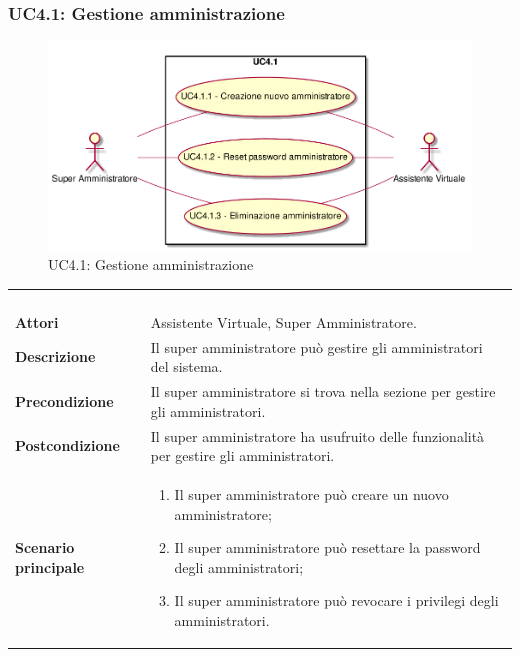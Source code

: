 \newpage\subsubsection{UC4.1: Gestione amministrazione}
\label{UC4.1}
\begin{figure}[h]
\centering
\includegraphics[width=\textwidth,height=\textheight,keepaspectratio]{images/UseCaseUC41.png}
\caption{UC4.1: Gestione amministrazione}
\end{figure}
\begin{longtable}{l|p{10cm}}
\rowcolor[gray]{0.8} \multicolumn{2}{c}{} \\
\rowcolor[gray]{0.8} \multicolumn{2}{c}{\textbf{UC4.1 - Gestione amministrazione}} \\
\rowcolor[gray]{0.8} \multicolumn{2}{c}{} \\
\hline
&\\
\textbf{Attori} & Assistente Virtuale, Super Amministratore.\\[7pt]
\textbf{Descrizione} & Il super amministratore può gestire gli amministratori del sistema.\\[7pt]
\textbf{Precondizione} & Il super amministratore si trova nella sezione per gestire gli amministratori.\\[7pt]
\textbf{Postcondizione} & Il super amministratore ha usufruito delle funzionalità per gestire gli amministratori.\\[7pt]
\textbf{Scenario principale} &\begin{enumerate}
\item  Il super amministratore può creare un nuovo amministratore;
\item  Il super amministratore può resettare la password degli amministratori;
\item  Il super amministratore può revocare i privilegi degli amministratori.
\end{enumerate}
\\[7pt]\hline
\end{longtable}

